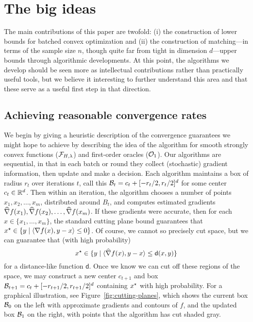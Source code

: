 
\section{The big ideas}
\label{sec:big-ideas}

The main contributions of this paper are
twofold: (i) the construction of lower bounds for batched convex
optimization and (ii) the construction of matching---in terms of the sample
size $n$, though quite far from tight in dimension $d$---upper bounds
through algorithmic developments.  At this point, the algorithms we develop
should be seen more as intellectual contributions rather than practically
useful tools, but we believe it interesting to further understand this area
and that these serve as a useful first step in that direction.

\subsection{Achieving reasonable convergence rates}

We begin by giving a heuristic description of the convergence guarantees we
might hope to achieve
by describing the idea of the algorithm for smooth strongly convex
functions ($\mathcal{F}_{H,\lambda}$) and first-order oracles ($\mathcal{O}_1$).
Our algorithms are sequential, in that in each batch
or round they collect (stochastic) gradient information, then update and
make a decision. Each algorithm maintains a box of radius $r_t$ over
iterations $t$, call this $\mathcal{B}_t = c_t + [-r_t/2, r_t/2]^d$ for some
center $c_t \in \mathbb{R}^d$. Then within an iteration, the algorithm chooses a
number of points $x_1, x_2, \ldots, x_m$, distributed around $B_t$, and
computes estimated gradients $\widehat{\nabla} f(x_1), \widehat{\nabla} f(x_2),
\ldots, \widehat{\nabla} f(x_m)$. If these gradients were accurate, then for
each $x \in \{x_1, \ldots, x_m\}$, the standard cutting plane bound
guarantees that $x^\star \in \{y \mid \langle\nabla f(x), y - x\rangle \le 0\}$. Of
course, we cannot so precisely cut space, but we can guarantee that (with
high probability)
\begin{equation*}
  x^\star \in \{y \mid \langle\widehat{\nabla} f(x), y - x\rangle \le \mathsf{d}(x, y)\}
\end{equation*}
for a distance-like function $\mathsf{d}$. Once we know we can cut off these
regions of the space, we may construct a new center $c_{t + 1}$ and box
$\mathcal{B}_{t + 1} = c_t + [-r_{t+1}/2, r_{t+1}/2]^d$ containing $x^\star$ with
high probability. For a graphical illustration, see
Figure~\ref{fig:cutting-planes}, which shows the current box $\mathcal{B}_0$ on
the left with approximate gradients and contours of $f$, and the updated box
$\mathcal{B}_1$ on the right, with points that the algorithm has cut shaded gray.

